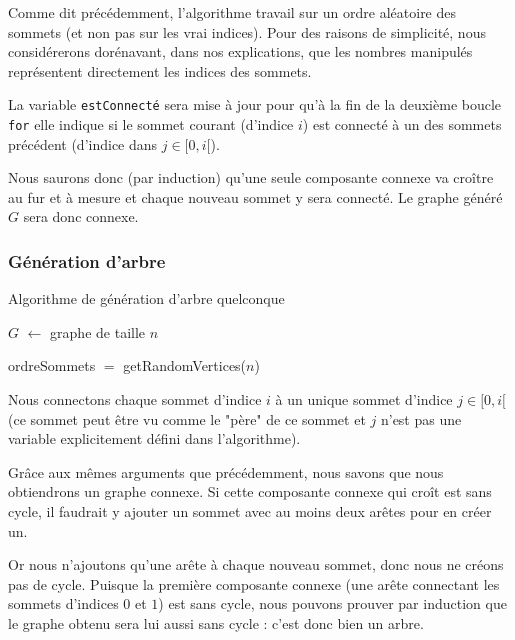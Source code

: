 \documentclass[a4paper,10pt]{article}
\begin{document}
Comme dit précédemment, l'algorithme travail sur un ordre aléatoire des sommets (et non pas sur les vrai indices). Pour des raisons de simplicité, nous considérerons dorénavant, dans nos explications, que les nombres manipulés représentent directement les indices des sommets.

La variable \texttt{estConnecté} sera mise à  jour pour qu'à la fin de la deuxième boucle \texttt{for} elle indique si le sommet courant (d'indice $i$) est connecté à un des sommets précédent (d'indice dans $j\in[0, i[$).

Nous saurons donc (par induction) qu'une seule composante connexe va croître au fur et à mesure et chaque nouveau sommet y sera connecté. Le graphe généré $G$ sera donc connexe.

\subsubsection{Génération d'arbre}

\begin{algorithm}[H]
\caption{Algorithme de génération d'arbre quelconque}
\BlankLine
$G$ $\leftarrow$ graphe de taille $n$

ordreSommets $=$ getRandomVertices($n$)



\end{algorithm}
\bigskip

Nous connectons chaque sommet d'indice $i$ à un unique sommet d'indice $j\in[0, i[$ (ce sommet peut être vu comme le "père" de ce sommet et $j$ n'est pas une variable explicitement défini dans l'algorithme).

Grâce aux mêmes arguments que précédemment, nous savons que nous obtiendrons un graphe connexe. Si cette composante connexe qui croît est sans cycle, il faudrait y ajouter un sommet avec au moins deux arêtes pour en créer un.

Or nous n'ajoutons qu'une arête à chaque nouveau sommet, donc nous ne créons pas de cycle. Puisque la première composante connexe (une arête connectant les sommets d'indices $0$ et $1$) est sans cycle, nous pouvons prouver par induction que le graphe obtenu sera lui aussi sans cycle : c'est donc bien un arbre.
\end{document}
